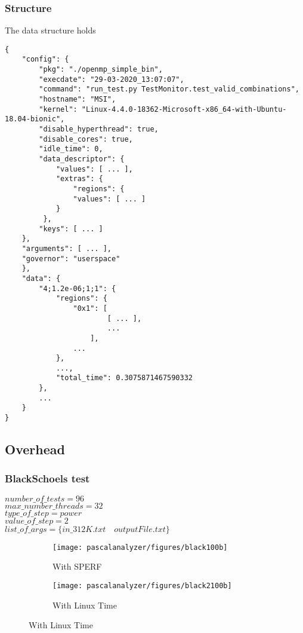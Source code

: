 \subsubsection{Structure}
The data structure holds

\begin{lstlisting}
{
    "config": {
        "pkg": "./openmp_simple_bin",
        "execdate": "29-03-2020_13:07:07",
        "command": "run_test.py TestMonitor.test_valid_combinations",
        "hostname": "MSI",
        "kernel": "Linux-4.4.0-18362-Microsoft-x86_64-with-Ubuntu-18.04-bionic",
        "disable_hyperthread": true,
        "disable_cores": true,
        "idle_time": 0,
        "data_descriptor": {
            "values": [ ... ],
            "extras": {
                "regions": {
                "values": [ ... ]
            }
         },
        "keys": [ ... ]
    },
    "arguments": [ ... ],
    "governor": "userspace"
    },
    "data": {
        "4;1.2e-06;1;1": {
            "regions": {
                "0x1": [
                        [ ... ],
                        ...
                    ],
                ...
            },
            ...,
            "total_time": 0.3075871467590332
        },
        ...
    }
}
\end{lstlisting}

\subsection{Overhead}
\subsubsection{BlackSchoels test}

$number\_of\_tests=96$\\
$max\_number\_threads=32$\\
$type\_of\_step=power$\\
$value\_of\_step=2$\\
$list\_of\_args=\{in\_312K.txt \quad outputFile.txt\}$

\begin{figure}[H]
	\centering
	\begin{subfigure}[b]{0.45\textwidth}
	\texttt{[image: pascalanalyzer/figures/black100b]}
	\caption{With SPERF}
	\label{fig:black100b}
	\end{subfigure}
	\begin{subfigure}[b]{0.45\textwidth}
	\texttt{[image: pascalanalyzer/figures/black2100b]}
	\caption{With Linux Time}
	\label{fig:black2100b}
	\end{subfigure}
\end{figure}


